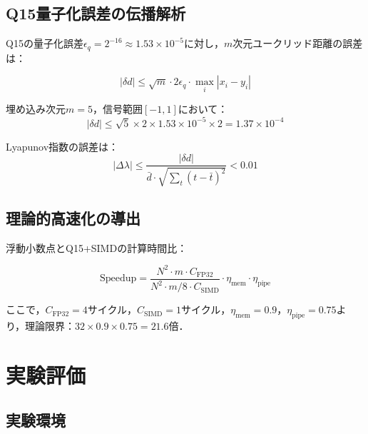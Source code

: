 \documentclass[10pt,twocolumn]{article}
\begin{document}
\begin{CJK}{UTF8}{min}
\subsection{Q15量子化誤差の伝播解析}

Q15の量子化誤差$\epsilon_q = 2^{-16} \approx 1.53 \times 10^{-5}$に対し，$m$次元ユークリッド距離の誤差は：

\begin{equation}
|\delta d| \leq \sqrt{m} \cdot 2\epsilon_q \cdot \max_i |x_i - y_i|
\end{equation}

埋め込み次元$m=5$，信号範囲$[-1,1]$において：
\begin{equation}
|\delta d| \leq \sqrt{5} \times 2 \times 1.53 \times 10^{-5} \times 2 = 1.37 \times 10^{-4}
\end{equation}

Lyapunov指数の誤差は：
\begin{equation}
|\Delta\lambda| \leq \frac{|\delta d|}{\bar{d} \cdot \sqrt{\sum_{t}(t - \bar{t})^2}} < 0.01
\end{equation}

\subsection{理論的高速化の導出}

浮動小数点とQ15+SIMDの計算時間比：

\begin{equation}
\text{Speedup} = \frac{N^2 \cdot m \cdot C_{\text{FP32}}}{N^2 \cdot m/8 \cdot C_{\text{SIMD}}} \cdot \eta_{\text{mem}} \cdot \eta_{\text{pipe}}
\end{equation}

ここで，$C_{\text{FP32}} = 4$サイクル，$C_{\text{SIMD}} = 1$サイクル，$\eta_{\text{mem}} = 0.9$，$\eta_{\text{pipe}} = 0.75$より，理論限界：$32 \times 0.9 \times 0.75 = 21.6$倍．

\section{実験評価}

\subsection{実験環境}


\end{CJK}
\end{document}
